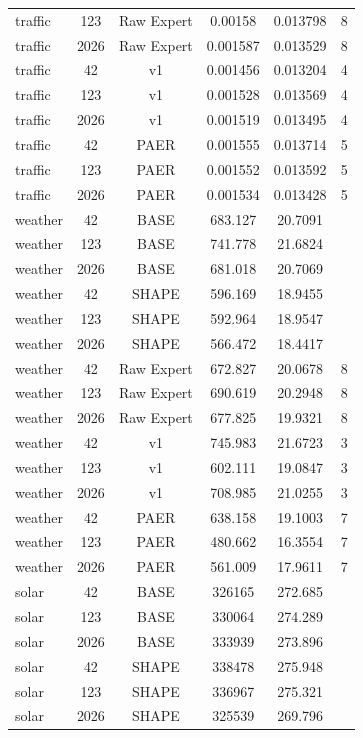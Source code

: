 \begin{table}[htbp]
\begin{tabular}{lccccc}
    traffic & 123 & Raw Expert & 0.00158 & 0.013798 & 8 \\
    traffic & 2026 & Raw Expert & 0.001587 & 0.013529 & 8 \\
    traffic & 42 & v1 & 0.001456 & 0.013204 & 4 \\
    traffic & 123 & v1 & 0.001528 & 0.013569 & 4 \\
    traffic & 2026 & v1 & 0.001519 & 0.013495 & 4 \\
    traffic & 42 & PAER & 0.001555 & 0.013714 & 5 \\
    traffic & 123 & PAER & 0.001552 & 0.013592 & 5 \\
    traffic & 2026 & PAER & 0.001534 & 0.013428 & 5 \\
    weather & 42 & BASE & 683.127 & 20.7091 &  \\
    weather & 123 & BASE & 741.778 & 21.6824 &  \\
    weather & 2026 & BASE & 681.018 & 20.7069 &  \\
    weather & 42 & SHAPE & 596.169 & 18.9455 &  \\
    weather & 123 & SHAPE & 592.964 & 18.9547 &  \\
    weather & 2026 & SHAPE & 566.472 & 18.4417 &  \\
    weather & 42 & Raw Expert & 672.827 & 20.0678 & 8 \\
    weather & 123 & Raw Expert & 690.619 & 20.2948 & 8 \\
    weather & 2026 & Raw Expert & 677.825 & 19.9321 & 8 \\
    weather & 42 & v1 & 745.983 & 21.6723 & 3 \\
    weather & 123 & v1 & 602.111 & 19.0847 & 3 \\
    weather & 2026 & v1 & 708.985 & 21.0255 & 3 \\
    weather & 42 & PAER & 638.158 & 19.1003 & 7 \\
    weather & 123 & PAER & 480.662 & 16.3554 & 7 \\
    weather & 2026 & PAER & 561.009 & 17.9611 & 7 \\
    solar & 42 & BASE & 326165 & 272.685 &  \\
    solar & 123 & BASE & 330064 & 274.289 &  \\
    solar & 2026 & BASE & 333939 & 273.896 &  \\
    solar & 42 & SHAPE & 338478 & 275.948 &  \\
    solar & 123 & SHAPE & 336967 & 275.321 &  \\
    solar & 2026 & SHAPE & 325539 & 269.796 &  \\

\end{tabular}
\end{table}

